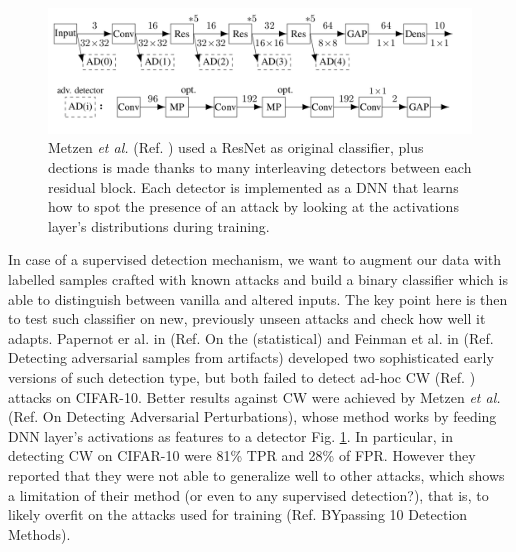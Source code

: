 \documentclass[LaM,binding=0.6cm]{./packages/sapthesis/sapthesis}
\begin{document}
            \begin{figure}[b]
                \centering
                \includegraphics[scale=0.30]{detection}
                \caption{Metzen \textit{et al.} (Ref. ) used a ResNet as original classifier, plus dections is made thanks to many interleaving detectors
                between each residual block. Each detector is implemented as a DNN that learns how to spot the presence
                of an attack by looking at the activations layer's distributions during training.}
                \label{fig:detection}
            \end{figure}

            In case of a supervised detection mechanism, we want to augment our data with labelled samples crafted with known
            attacks and build a binary classifier which is able to distinguish between vanilla and altered inputs. The key 
            point here is then to test such classifier on new, previously unseen attacks and check how well it adapts.  
            Papernot er al. in (Ref. On the (statistical) and Feinman et al. in (Ref. Detecting adversarial samples from artifacts)
            developed two sophisticated early versions of such detection type, but both failed to detect ad-hoc CW (Ref. ) attacks on CIFAR-10.
            Better results against CW were achieved  by Metzen \textit{et al.} (Ref. On Detecting Adversarial Perturbations), whose method
            works by feeding DNN layer's activations as features to a detector Fig. \ref{fig:detection}. In particular, in detecting CW on CIFAR-10
            were 81\% TPR and 28\% of FPR. However they reported that they were not able to generalize well 
            to other attacks, which shows a limitation of their method (or even to any supervised detection?), 
            that is, to likely overfit on the attacks used for training (Ref. BYpassing 10 Detection Methods).
\end{document}
